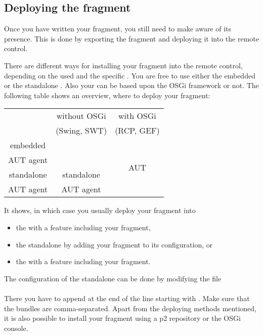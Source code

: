 \subsection{Deploying the fragment}

Once you have written your fragment, you still need to make \app{}
aware of its presence. This is done by exporting the fragment and
deploying it into the \app{} remote control.

There are different ways for installing your fragment into the remote
control, depending on the  \gdagent{} used and the specific \gdaut{}. You are free to
use either the embedded \gdagent{} or the standalone \gdagent{}. Also your \gdaut{}
can be based upon the OSGi framework or not. The following table shows an
overview, where to deploy your fragment:

\begin{center}
\begin{tabular}{|c||c|c|}
\hline
~ & without OSGi & with OSGi\\
~ & (Swing, SWT) & (RCP, GEF)\\
\hline\hline
embedded & \multirow{2}{*}{\ite{}} & \multirow{4}{*}{AUT}\\
AUT agent & & \\
\hhline{--~}
standalone & standalone & \\
AUT agent  & AUT agent  & \\
\hline
\end{tabular}
\end{center}

It shows, in which case you usually deploy your fragment into
\begin{itemize}
  \item the \ite{} with a feature including your fragment,
  \item the standalone \gdagent{} by adding your fragment to its configuration,
        or
  \item the \gdaut{} with a feature including your fragment.
\end{itemize}

The configuration of the standalone \gdagent{} can be done by modifying the
file\\
\\
There you have to append  at the end of the
line starting with . Make sure that the bundles are
comma-separated. Apart from the  deploying methods mentioned, it is also
possible to install your fragment using a p2 repository or the OSGi console.


